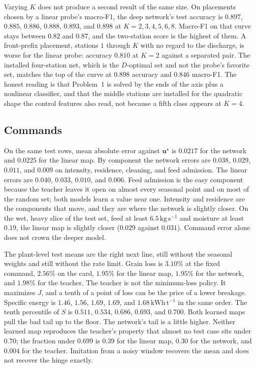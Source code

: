 Varying \(K\) does not produce a second result of the same size. On placements chosen by a linear probe's macro-F1, the deep network's test accuracy is \(0.897\), \(0.885\), \(0.886\), \(0.888\), \(0.893\), and \(0.898\) at \(K=2,3,4,5,6,8\). Macro-F1 on that curve stays between \(0.82\) and \(0.87\), and the two-station score is the highest of them. A front-prefix placement, stations \(1\) through \(K\) with no regard to the discharge, is worse for the linear probe: accuracy \(0.810\) at \(K=2\) against a separated pair. The installed four-station net, which is the \(D\)-optimal set and not the probe's favorite set, matches the top of the curve at \(0.898\) accuracy and \(0.846\) macro-F1. The honest reading is that Problem~1 is solved by the ends of the axis plus a nonlinear classifier, and that the middle stations are installed for the quadratic shape the control features also read, not because a fifth class appears at \(K=4\).

\subsection{Commands}

On the same test rows, mean absolute error against \(\mathbf{u}^\star\) is \(0.0217\) for the network and \(0.0225\) for the linear map. By component the network errors are \(0.038\), \(0.029\), \(0.011\), and \(0.009\) on intensity, residence, cleaning, and feed admission. The linear errors are \(0.040\), \(0.033\), \(0.010\), and \(0.006\). Feed admission is the easy component because the teacher leaves it open on almost every seasonal point and on most of the random set; both models learn a value near one. Intensity and residence are the components that move, and they are where the network is slightly closer. On the wet, heavy slice of the test set, feed at least \(6.5\,\mathrm{kg\,s^{-1}}\) and moisture at least \(0.19\), the linear map is slightly closer (\(0.029\) against \(0.031\)). Command error alone does not crown the deeper model.

The plant-level test means are the right next line, still without the seasonal weights and still without the rate limit. Grain loss is \(3.10\%\) at the fixed command, \(2.56\%\) on the card, \(1.95\%\) for the linear map, \(1.95\%\) for the network, and \(1.98\%\) for the teacher. The teacher is not the minimum-loss policy. It maximizes \(J\), and a tenth of a point of loss can be the price of a lower breakage. Specific energy is \(1.46\), \(1.56\), \(1.69\), \(1.69\), and \(1.68\,\mathrm{kWh\,t^{-1}}\) in the same order. The tenth percentile of \(S\) is \(0.511\), \(0.534\), \(0.686\), \(0.693\), and \(0.700\). Both learned maps pull the bad tail up to the floor. The network's tail is a little higher. Neither learned map reproduces the teacher's property that almost no test case sits under \(0.70\); the fraction under \(0.699\) is \(0.39\) for the linear map, \(0.30\) for the network, and \(0.004\) for the teacher. Imitation from a noisy window recovers the mean and does not recover the hinge exactly.


